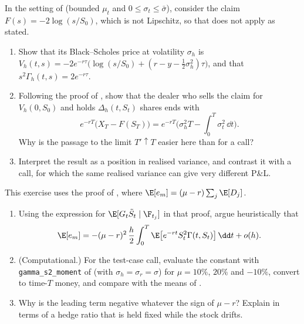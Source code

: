 \begin{exercise}\label{ex:hd-variance-swap}
\easy In the setting of  (bounded $\mu_t$ and $0\le\sigma_t\le\bar\sigma$), consider the
claim $F(s)=-2\log(s/S_0)$, which is not Lipschitz, so that  does not
apply as stated.
\begin{enumerate}[label=(\alph*)]
  \item Show that its Black--Scholes price at volatility $\sigma_h$ is
    $V_h(t,s)=-2e^{-r\tau}\big(\log(s/S_0)+(r-y-\frac12\sigma_h^2)\tau\big)$, and that
    $s^2\Gamma_h(t,s)=2e^{-r\tau}$.
  \item Following the proof of , show that the dealer who sells the
    claim for $V_h(0,S_0)$ and holds $\Delta_h(t,S_t)$ shares ends with
    \[
      e^{-rT}\big(X_T-F(S_T)\big)=e^{-rT}\Big(\sigma_h^2T-\int_0^T\sigma_t^2\,\dd t\Big).
    \]
    Why is the passage to the limit $T'\uparrow T$ easier here than for a call?
  \item Interpret the result as a position in realised variance, and contrast it with a call,
    for which the same realised variance can give very different P\&L.
\end{enumerate}
\end{exercise}

\begin{exercise}\label{ex:hd-drift-bias}
\medium This exercise uses the proof of , where
$\E[e_m]=(\mu-r)\sum_j\E[D_j]$.
\begin{enumerate}[label=(\alph*)]
  \item Using the expression for $\E[G_t\tilde S_t\mid\F_{t_j}]$ in that proof, argue heuristically
    that
    \[
      \E[e_m]=-(\mu-r)^2\,\frac h2\int_0^T\E\big[e^{-rt}S_t^2\Gamma(t,S_t)\big]\,\dd t+o(h).
    \]
  \item (Computational.) For the test-case call, evaluate the constant with
    \texttt{gamma\_s2\_moment} of  (with $\sigma_h=\sigma_r=\sigma$) for
    $\mu=10\%$, $20\%$ and $-10\%$, convert to time-$T$ money, and compare with the means of
    .
  \item Why is the leading term negative whatever the sign of $\mu-r$? Explain in terms of a
    hedge ratio that is held fixed while the stock drifts.
\end{enumerate}
\end{exercise}

